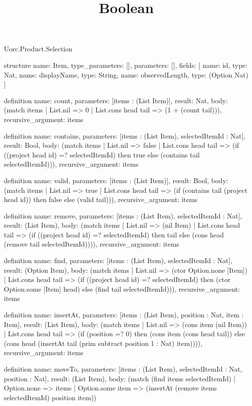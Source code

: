 \begin{lexlean}{Uorc.Product.Selection}
\title{Boolean}
\begin{semanticmodule}
structure{
  name: Item,
  type_parameters: [],
  parameters: [],
  fields: [
    {name: id, type: Nat},
    {name: displayName, type: String},
    {name: observedLength, type: (Option Nat)}
  ]
}

definition{
  name: count,
  parameters: [items : (List Item)],
  result: Nat,
  body: (match items | List.nil => 0 | List.cons head tail => (1 + (count tail))),
  recursive_argument: items
}

definition{
  name: contains,
  parameters: [items : (List Item), selectedItemId : Nat],
  result: Bool,
  body: (match items
    | List.nil => false
    | List.cons head tail => (if ((project head id) =? selectedItemId) then true else (contains tail selectedItemId))),
  recursive_argument: items
}

definition{
  name: valid,
  parameters: [items : (List Item)],
  result: Bool,
  body: (match items
    | List.nil => true
    | List.cons head tail => (if (contains tail (project head id)) then false else (valid tail))),
  recursive_argument: items
}

definition{
  name: remove,
  parameters: [items : (List Item), selectedItemId : Nat],
  result: (List Item),
  body: (match items
    | List.nil => (nil Item)
    | List.cons head tail => (if ((project head id) =? selectedItemId) then tail else (cons head (remove tail selectedItemId)))),
  recursive_argument: items
}

definition{
  name: find,
  parameters: [items : (List Item), selectedItemId : Nat],
  result: (Option Item),
  body: (match items
    | List.nil => (ctor Option.none [Item])
    | List.cons head tail => (if ((project head id) =? selectedItemId) then (ctor Option.some [Item] head) else (find tail selectedItemId))),
  recursive_argument: items
}

definition{
  name: insertAt,
  parameters: [items : (List Item), position : Nat, item : Item],
  result: (List Item),
  body: (match items
    | List.nil => (cons item (nil Item))
    | List.cons head tail => (if (position =? 0) then (cons item (cons head tail)) else (cons head (insertAt tail (prim subtract position 1 : Nat) item)))),
  recursive_argument: items
}

definition{
  name: moveTo,
  parameters: [items : (List Item), selectedItemId : Nat, position : Nat],
  result: (List Item),
  body: (match (find items selectedItemId)
    | Option.none => items
    | Option.some item => (insertAt (remove items selectedItemId) position item))
}


\end{semanticmodule}
\end{lexlean}
